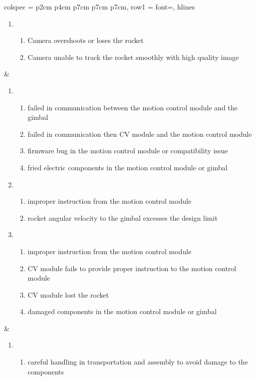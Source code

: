 \documentclass{article}
\begin{document}
\begin{table}[htbp]
{\begin{tblr}{
    colspec = {p{2cm} p{4cm} p{7cm} p{7cm} p{7cm}},
    row{1} = {font=\bfseries},
    hlines
  }
\begin{enumerate}
      \item \begin{enumerate}
        \item Camera overshoots or loses the rocket
        \item Camera unable to track the rocket smoothly with high quality image
        \end{enumerate}
    \end{enumerate}
    & 
    \begin{enumerate}
        \item \begin{enumerate}
            \item failed in communication between the motion control module and the gimbal
            \item failed in communication then CV module and the motion control module
            \item firmware bug in the motion control module or compatibility issue
            \item fried electric components in the motion control module or gimbal
        \end{enumerate}
        \item \begin{enumerate}
            \item improper instruction from the motion control module
            \item rocket angular velocity to the gimbal excesses the design limit
        \end{enumerate}
        \item \begin{enumerate}
            \item improper instruction from the motion control module
            \item CV module fails to provide proper instruction to the motion control module
            \item CV module lost the rocket
            \item damaged components in the motion control module or gimbal
        \end{enumerate}
    \end{enumerate}
    &
    \begin{enumerate}
        \item \begin{enumerate}
            \item careful handling in transportation and assembly to avoid damage to the 
            components 

\end{enumerate}
\end{enumerate}
\end{tblr}}
\end{table}
\end{document}
